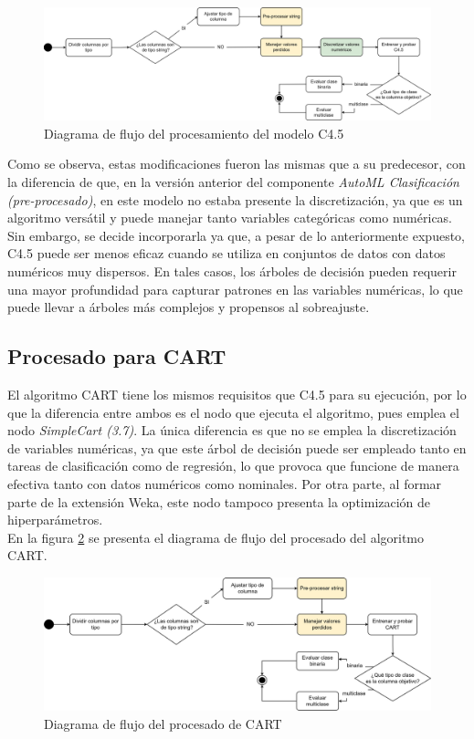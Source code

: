 \begin{figure}[h]
	\centering
	\includegraphics[width=1\linewidth]{"figuras/capi 2/modelos/procesado c4pt5.drawio"}
	\caption{Diagrama de flujo del procesamiento del modelo C4.5}
	\label{fig:procesado-c4pt5}
\end{figure}

Como se observa, estas modificaciones fueron las mismas que a su predecesor, con la diferencia de que, en la versión anterior del componente \textit{AutoML Clasificación (pre-procesado)}, en este modelo no estaba presente la discretización, ya que es un algoritmo versátil y puede manejar tanto variables categóricas como numéricas. Sin embargo, se decide incorporarla ya que, a pesar de lo anteriormente expuesto, C4.5 puede ser menos eficaz cuando se utiliza en conjuntos de datos con datos numéricos muy dispersos. En tales casos, los árboles de decisión pueden requerir una mayor profundidad para capturar patrones en las variables numéricas, lo que puede llevar a árboles más complejos y propensos al sobreajuste. 

\subsection{Procesado para CART}
El algoritmo CART tiene los mismos requisitos que C4.5 para su ejecución, por lo que la diferencia entre ambos es el nodo que ejecuta el algoritmo, pues emplea el nodo \textit{SimpleCart (3.7)}. La única diferencia es que no se emplea la discretización de variables numéricas, ya que este árbol de decisión puede ser empleado tanto en tareas de clasificación como de regresión, lo que provoca que funcione de manera efectiva tanto con datos numéricos como nominales. Por otra parte, al formar parte de la extensión Weka, este nodo tampoco presenta la optimización de hiperparámetros. \\
En la figura \ref{fig:procesado-cart} se presenta el diagrama de flujo del procesado del algoritmo CART.

\begin{figure}[H]
	\centering
	\includegraphics[width=1\linewidth]{"figuras/capi 2/modelos/procesado cart.drawio"}
	\caption{Diagrama de flujo del procesado de CART}
	\label{fig:procesado-cart}
\end{figure}


